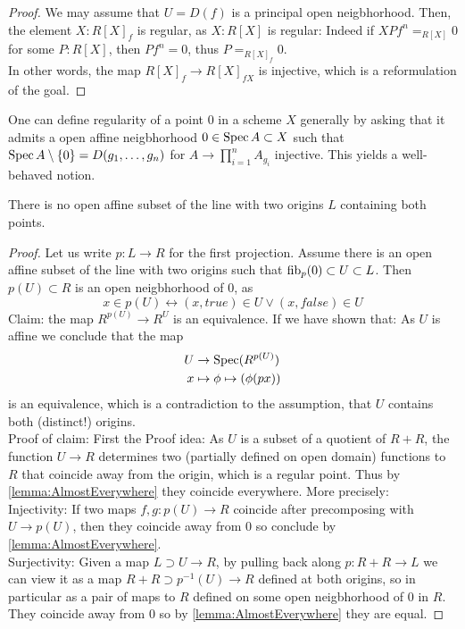 \documentclass{article}
\begin{document}
\begin{proof}
	We may assume that $U = D(f)$ is a principal open neigbhorhood. Then, the element $X : R[X]_f$ is regular, as $X : R[X]$ is regular: Indeed if $X P f^n  =_{R[X]} 0$ for some $P : R[X]$, then $P f^n = 0$, thus $P =_{R[X]_f}  0$. \\
	In other words, the map $R[X]_f \to R[X]_{f X}$ is injective, which is a reformulation of the 	goal.
\end{proof}
\begin{rmk}
	One can define regularity of a point 0 in a scheme $X$ generally by asking that it admits a open affine neigbhorhood $0 \in \operatorname{Spec} A \subset X$ such that $\operatorname{Spec} A \setminus \{0\} = D(g_1,\hdots,g_n)$ for $A \to \prod_{i=1}^n A_{g_i}$ injective. This yields a well-behaved notion. \cite{geomstacks}
\end{rmk}
\begin{lemma}{\label{lemma:noAffNbhd}}
	There is no open affine subset of the line with two origins $L$ containing both points.
\end{lemma}
\begin{proof}
	Let us write $p : L \to R$ for the first projection.
	Assume there is an open affine subset of the line with two origins such that $\operatorname{fib}_p(0) \subset U \subset L$. Then $p(U) \subset R$ is an open neigbhorhood of 0, as 
	\[
	x \in p(U) \leftrightarrow (x,true) \in U \lor (x,false) \in U
	\]
	Claim: the map $R^{p(U)} \to R^U$ is an equivalence. If we have shown that: As $U$ is affine we conclude that the map
	\begin{align*}
		U &\to \operatorname{Spec} (R^{p(U)}) \\
		x &\mapsto \phi \mapsto (\phi(px))		
	\end{align*}
	is an equivalence, which is a contradiction to the assumption, that $U$ contains both (distinct!) origins. \\
	Proof of claim: 
	First the Proof idea: As $U$ is a subset of a quotient of $R + R$, the function $U \to R$ determines two (partially defined on open domain) functions to $R$ that coincide away from the origin, which is a regular point. Thus by \ref{lemma:AlmostEverywhere} they coincide everywhere. More precisely:\\
	Injectivity: If two maps $f , g : p(U) \to R$ coincide after precomposing with $U \to p(U)$, then they coincide away from $0$
	so conclude by \ref{lemma:AlmostEverywhere}. \\
	Surjectivity: Given a map $L \supset U \to R$, by pulling back along $p : R + R \to L$  we can view it as a map $R + R \supset p^{-1}(U) \to R$ defined at both origins, so in particular as a pair of maps to $R$ defined on some open neigbhorhood of 0 in $R$. They coincide away from 0 so by \ref{lemma:AlmostEverywhere} they are equal.
\end{proof}
\end{document}
